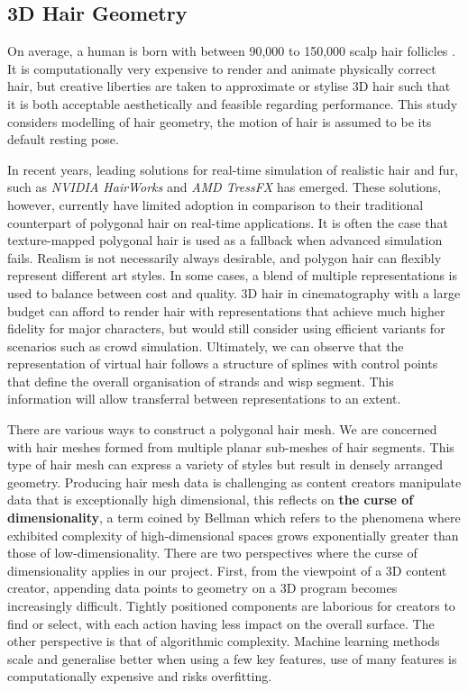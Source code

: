 \documentclass[ %
author={Dillon Keith Diep},
supervisor={Dr. Carl Henrik Ek},
degree={MEng},
title={ART-CG Hair:},
subtitle={Assisted Real-time Content Generation of Stylised Virtual Hair},
type={Research},
year={2017} ]{dissertation}
\begin{document}
\subsection{3D Hair Geometry}
On average, a human is born with between 90,000 to 150,000 scalp hair follicles \cite{hairfollicles}. It is computationally very expensive to render and animate physically correct hair, but creative liberties are taken to approximate or stylise 3D hair such that it is both acceptable aesthetically and feasible regarding performance. This study considers modelling of hair geometry, the motion of hair is assumed to be its default resting pose.

In recent years, leading solutions for real-time simulation of realistic hair and fur, such as \textit{NVIDIA HairWorks} and \textit{AMD TressFX} has emerged. These solutions, however, currently have limited adoption in comparison to their traditional counterpart of polygonal hair on real-time applications. It is often the case that texture-mapped polygonal hair is used as a fallback when advanced simulation fails. Realism is not necessarily always desirable, and polygon hair can flexibly represent different art styles. In some cases, a blend of multiple representations is used to balance between cost and quality. 3D hair in cinematography with a large budget can afford to render hair with representations that achieve much higher fidelity for major characters, but would still consider using efficient variants for scenarios such as crowd simulation. Ultimately, we can observe that the representation of virtual hair follows a structure of splines with control points that define the overall organisation of strands and wisp segment. This information will allow transferral between representations to an extent.

There are various ways to construct a polygonal hair mesh. We are concerned with hair meshes formed from multiple planar sub-meshes of hair segments. This type of hair mesh can express a variety of styles but result in densely arranged geometry. 
Producing hair mesh data is challenging as content creators manipulate data that is exceptionally high dimensional, this reflects on \textbf{the curse of dimensionality}, a term coined by Bellman \cite{curseofdim} which refers to the phenomena where exhibited complexity of high-dimensional spaces grows exponentially greater than those of low-dimensionality. There are two perspectives where the curse of dimensionality applies in our project. First, from the viewpoint of a 3D content creator, appending data points to geometry on a 3D program becomes increasingly difficult. Tightly positioned components are laborious for creators to find or select, with each action having less impact on the overall surface. The other perspective is that of algorithmic complexity. Machine learning methods scale and generalise better when using a few key features, use of many features is computationally expensive and risks overfitting.
\end{document}
